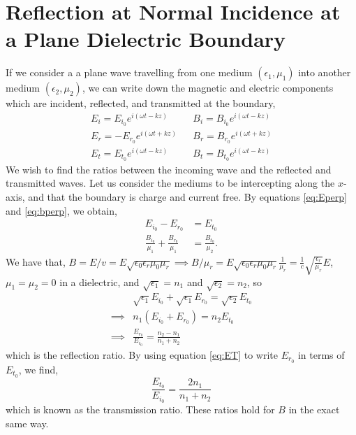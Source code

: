 \documentclass{book}
\begin{document}
\section{Reflection at Normal Incidence at a Plane Dielectric Boundary}
If we consider a a plane wave travelling from one medium $(\epsilon_1, \mu_1)$ into another medium $(\epsilon_2, \mu_2)$, we can write down the magnetic and electric components which are incident, reflected, and transmitted at the boundary,
\begin{align}
	E_i = E_{i_0}e^{i(\omega t - kz)} && B_i = B_{i_0}e^{i(\omega t - kz)} \\
	E_r = -E_{r_0}e^{i(\omega t + kz)} && B_r = B_{r_0}e^{i(\omega t + kz)}\\
	E_t = E_{t_0}e^{i(\omega t - kz)} && B_t = B_{t_0}e^{i(\omega t - kz)}
\end{align}
We wish to find the ratios between the incoming wave and the reflected and transmitted waves. Let us consider the mediums to be intercepting along the $x$-axis, and that the boundary is charge and current free. By equations \eqref{eq:Eperp} and \eqref{eq:bperp}, we obtain,
\begin{align}
	E_{i_0} - E_{r_0} & = E_{t_0} \label{eq:ET} \\
	\frac{B_{i_0}}{\mu_1} + \frac{B_{r_0}}{\mu_1} & = \frac{B_{t_0}}{\mu_2}.
\end{align}
We have that, $B = E/v = E\sqrt{\epsilon_0\epsilon_r\mu_0\mu_r} \implies B/\mu_r = E\sqrt{\epsilon_0\epsilon_r\mu_0\mu_r}\frac{1}{\mu_r} = \frac{1}{c}\sqrt{\frac{\epsilon_r}{\mu_r}}E$, $\mu_1 = \mu_2 = 0$ in a dielectric, and $\sqrt{\epsilon_1} = n_1$ and $\sqrt{\epsilon_2} = n_2$, so
\begin{equation}
	\begin{split}
		& \sqrt{\epsilon_1}E_{i_0} + \sqrt{\epsilon_1}E_{r_0} = \sqrt{\epsilon_2}E_{t_0} \\
		\implies & n_1(E_{i_0} + E_{r_0}) = n_2E_{t_0} \\
		\implies & \boxed{\frac{E_{r_0}}{E_{i_0}} = \frac{n_2 - n_1}{n_1 + n_2}}
	\end{split}
\end{equation} 
which is the reflection ratio. By using equation \eqref{eq:ET} to write $E_{r_0}$ in terms of $E_{t_0}$, we find,
\begin{equation}
	\boxed{\frac{E_{t_0}}{E_{i_0}} = \frac{2n_1}{n_1 + n_2}}
\end{equation}
which is known as the transmission ratio. These ratios hold for $B$ in the exact same way.
\end{document}

